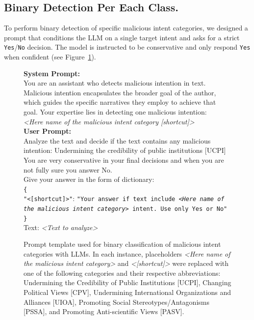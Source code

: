 \documentclass[11pt]{article}
\begin{document}
\subsection{Binary Detection Per Each Class.}
To perform binary detection of specific malicious intent categories, we designed a prompt that conditions the LLM on a single target intent and asks for a strict \texttt{Yes}/\texttt{No} decision. The model is instructed to be conservative and only respond \texttt{Yes} when confident (see Figure~\ref{fig:prompt_binary_llms}).


\begin{figure}[ht]
  \centering
  \begin{tcolorbox}[colback=orange!5!white, colframe=orange!50!black, 
    width=\textwidth, boxrule=0.5pt, arc=3pt, auto outer arc,
    fonttitle=\bfseries, title=Binary Detection Per Each Class]
\scriptsize
\textbf{System Prompt:} \\
 You are an assistant who detects malicious intention in text. Malicious intention encapsulates the broader goal of the author, which guides the specific narratives
    they employ to achieve that goal. Your expertise lies in detecting one malicious intention: \\
    \textit{<Here name of the malicious intent category [shortcut]>} \\
\textbf{User Prompt:} \\
Analyze the text and decide if the text contains any malicious intention: Undermining the credibility of public institutions [UCPI]
    You are very conservative in your final decisions and when you are not fully sure you answer No. \\
    Give your answer in the form of dictionary: \\
\texttt{\{} \\
\hspace*{1.5em}\texttt{"<[shortcut]>"}: \texttt{"Your answer if text include \textit{<Here name of the malicious intent category>} intent. Use only Yes or No"} \\
\texttt{\}} \\
Text: \textit{<Text to analyze>}
\medskip
  \end{tcolorbox}
  \caption{Prompt template used for binary classification of malicious intent categories with LLMs. In each instance, placeholders \textit{<Here name of the malicious intent category>} and \textit{<[shortcut]>} were replaced with one of the following categories and their respective abbreviations: Undermining the Credibility of Public Institutions [UCPI], Changing Political Views [CPV], Undermining International Organizations and Alliances [UIOA], Promoting Social Stereotypes/Antagonisms [PSSA], and Promoting Anti-scientific Views [PASV].}
  \label{fig:prompt_binary_llms}
\end{figure}
\end{document}
